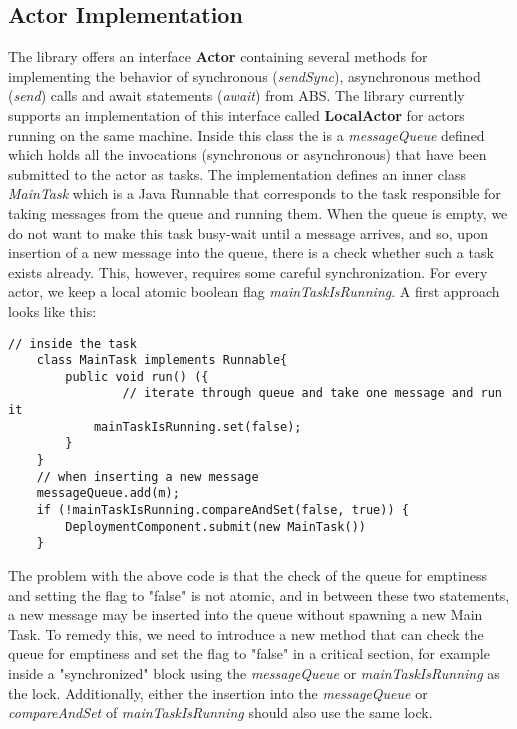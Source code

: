 \subsection{Actor Implementation}
The library offers an interface \textbf{Actor} containing several methods for implementing the behavior of synchronous (\textit{sendSync}), asynchronous method (\textit{send}) calls and await statements (\textit{await}) from ABS. The library currently supports an implementation of this interface called \textbf{LocalActor} for actors running on the same machine. Inside this class the is a \textit{messageQueue} defined which holds all the invocations (synchronous or asynchronous) that have been submitted to the actor as tasks. The implementation defines an inner class \textit{MainTask} which is a Java Runnable that corresponds to the task responsible for taking messages from the queue and running them. When the queue is empty, we do not want to make this task busy-wait until a message arrives, and so, upon insertion of a new message into the queue, there is a check whether such a task exists already. This, however, requires some careful synchronization. For every actor, we keep a local atomic boolean flag \textit{mainTaskIsRunning}. A first approach looks like this:

\begin{lstlisting}[caption= Basic Synchronization for the Demand-Driven Approach]
	// inside the task
	class MainTask implements Runnable{
		public void run() ({
				// iterate through queue and take one message and run it
			mainTaskIsRunning.set(false);
		}
	}
	// when inserting a new message
	messageQueue.add(m);
	if (!mainTaskIsRunning.compareAndSet(false, true)) {
		DeploymentComponent.submit(new MainTask())
	}
\end{lstlisting}

The problem with the above code is that the check of the queue for emptiness and setting the flag to "false" is not atomic, and in between these two statements, a new message may be inserted into the queue without spawning a new Main Task. To remedy this, we need to introduce a new method that can check the queue for emptiness and set the flag to "false" in a critical section, for example inside a "synchronized" block using the \textit{messageQueue} or \textit{mainTaskIsRunning} as the lock. Additionally, either the insertion into the \textit{messageQueue} or \textit{compareAndSet} of \textit{mainTaskIsRunning} should also use the same lock.

